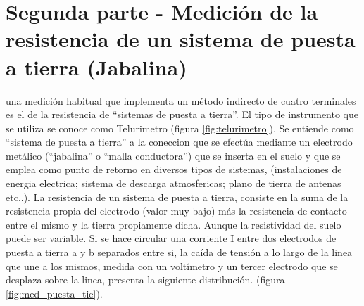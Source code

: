\documentclass[12pt, letterpaper]{article}
\begin{document}
	
\section{Segunda parte - Medición de la resistencia de un sistema de puesta a tierra (Jabalina)}
una medición habitual que implementa un método indirecto de cuatro terminales es el de la resistencia de “sistemas de puesta a tierra”. El tipo de
instrumento que se utiliza se conoce como Telurimetro (figura \ref{fig:telurimetro}). Se entiende como “sistema de puesta a tierra” a la coneccion que se efectúa
mediante un electrodo metálico (“jabalina” o “malla conductora”) que se inserta en el suelo y
que se emplea como punto de retorno en diversos tipos de sistemas, (instalaciones de energia
electrica; sistema de descarga atmosfericas; plano de tierra de antenas etc..).
La resistencia de un sistema de puesta a tierra, consiste en la suma de la resistencia propia del
electrodo (valor muy bajo) más la resistencia de contacto entre
el mismo y la tierra propiamente dicha. Aunque la resistividad del suelo puede ser variable.
Si se hace circular una corriente I entre dos electrodos de puesta a tierra a y b separados entre si, la caída de tensión a lo largo de la linea que une a los mismos, medida con un
voltímetro y un tercer electrodo que se desplaza sobre la linea, presenta la
siguiente distribución. (figura \ref{fig:med_puesta_tie}).
\end{document}
